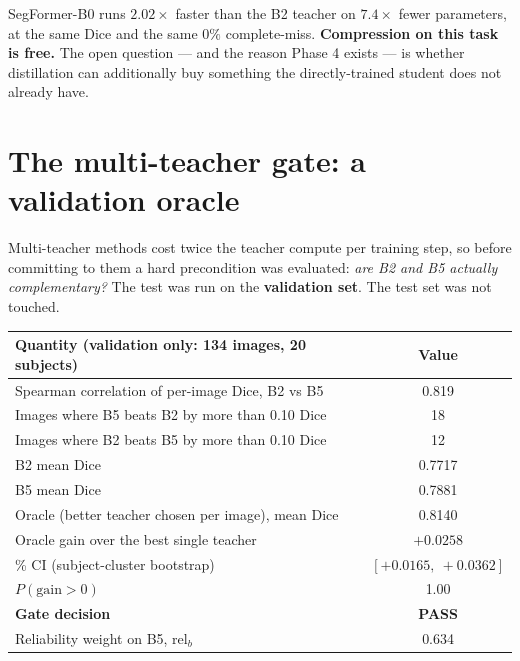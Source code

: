 \documentclass[11pt]{article}
\newcommand{\win}[1]{\textcolor{wingreen}{\textbf{#1}}}
\begin{document}
SegFormer-B0 runs $2.02\times$ faster than the B2 teacher on $7.4\times$ fewer parameters, at the
same Dice and the same $0\%$ complete-miss. \textbf{Compression on this task is free.} The open
question --- and the reason Phase 4 exists --- is whether distillation can additionally buy
something the directly-trained student does not already have.

\section{The multi-teacher gate: a validation oracle}
\label{sec:oracle}

Multi-teacher methods cost twice the teacher compute per training step, so before committing to
them a hard precondition was evaluated: \emph{are B2 and B5 actually complementary?} The test was
run on the \textbf{validation set}. The test set was not touched.

\begin{center}\small
\begin{tabular}{>{\raggedright\arraybackslash}p{9.6cm} C}
\toprule
\textbf{Quantity (validation only: 134 images, 20 subjects)} & \textbf{Value} \\
\midrule
Spearman correlation of per-image Dice, B2 vs B5   & 0.819 \\
Images where B5 beats B2 by more than 0.10 Dice    & 18 \\
Images where B2 beats B5 by more than 0.10 Dice    & 12 \\
B2 mean Dice                                       & 0.7717 \\
B5 mean Dice                                       & 0.7881 \\
Oracle (better teacher chosen per image), mean Dice & 0.8140 \\
Oracle gain over the best single teacher            & $+0.0258$ \\
\% CI (subject-cluster bootstrap)           & $[+0.0165,\ +0.0362]$ \\
\quad $P(\text{gain}>0)$                            & 1.00 \\
\textbf{Gate decision}                              & \win{PASS} \\
Reliability weight on B5, $\mathrm{rel}_b$          & 0.634 \\
\bottomrule
\end{tabular}
\end{center}
\end{document}

